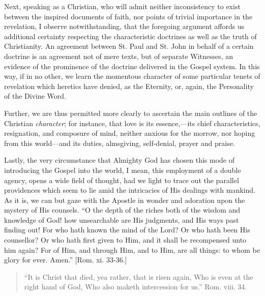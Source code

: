 Next, speaking as a Christian, who will admit neither inconsistency
to exist between the inspired documents of faith, nor points of trivial
importance in the revelation, I observe notwithstanding, that the
foregoing argument affords us additional certainty respecting the
characteristic doctrines as well as the truth of Christianity. An
agreement between St. Paul and St. John in behalf of a certain doctrine
is an agreement not of mere texts, but of separate Witnesses, an
evidence of the prominence of the doctrine delivered in the Gospel
system. In this way, if in no other, we learn the momentous character of
some particular tenets of revelation which heretics have denied, as the
Eternity, or, again, the Personality of the Divine Word.

Further, we are thus permitted more clearly to ascertain the main
outlines of the Christian \emph{character}; for instance, that love is
its essence,—its chief characteristics, resignation, and composure of
mind, neither anxious for the morrow, nor hoping from this world—and
its duties, almsgiving, self-denial, prayer and praise.

Lastly, the very circumstance that Almighty God has chosen this mode
of introducing the Gospel into the world, I mean, this employment of a
double agency, opens a wide field of thought, had we light to trace out
the parallel providences which seem to lie amid the intricacies of His
dealings with mankind. As it is, we can but gaze with the Apostle in
wonder and adoration upon the mystery of His counsels. ``O the depth
of the riches both of the wisdom and knowledge of God! how unsearchable
are His judgments, and His ways past finding out! For who hath known the
mind of the Lord? Or who hath been His counsellor? Or who hath first
given to Him, and it shall be recompensed unto him again? For of Him,
and through Him, and to Him, are all things: to whom be glory for ever.
Amen.'' [Rom. xi. 33-36.]


\begin{quote}

``It is Christ that died, yea rather, that is risen again, Who
is even at the right hand of God, Who also maketh intercession for
us.'' Rom. viii. 34.

\end{quote}

